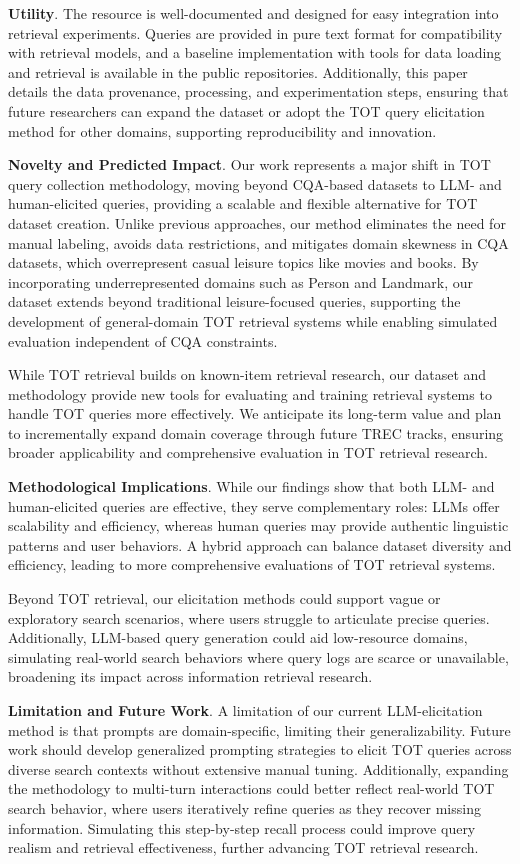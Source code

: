 \textbf{Utility}.
%
The resource is well-documented and designed for easy integration into retrieval experiments. Queries are provided in pure text format for compatibility with retrieval models, and a baseline implementation with tools for data loading and retrieval is available in the public repositories.
Additionally, this paper details the data provenance, processing, and experimentation steps, ensuring that future researchers can expand the dataset or adopt the TOT query elicitation method for other domains, supporting reproducibility and innovation.




\textbf{Novelty and Predicted Impact}.
Our work represents a major shift in TOT query collection methodology, moving beyond CQA-based datasets to LLM- and human-elicited queries, providing a scalable and flexible alternative for TOT dataset creation. Unlike previous approaches, our method eliminates the need for manual labeling, avoids data restrictions, and mitigates domain skewness in CQA datasets, which overrepresent casual leisure topics like movies and books. By incorporating underrepresented domains such as Person and Landmark, our dataset extends beyond traditional leisure-focused queries, supporting the development of general-domain TOT retrieval systems while enabling simulated evaluation independent of CQA constraints.

While TOT retrieval builds on known-item retrieval research, our dataset and methodology provide new tools for evaluating and training retrieval systems to handle TOT queries more effectively. We anticipate its long-term value and plan to incrementally expand domain coverage through future TREC tracks, ensuring broader applicability and comprehensive evaluation in TOT retrieval research.

\textbf{Methodological Implications}.
While our findings show that both LLM- and human-elicited queries are effective, they serve complementary roles: LLMs offer scalability and efficiency, whereas human queries may provide authentic linguistic patterns and user behaviors. A hybrid approach can balance dataset diversity and efficiency, leading to more comprehensive evaluations of TOT retrieval systems.

Beyond TOT retrieval, our elicitation methods could support vague or exploratory search scenarios, where users struggle to articulate precise queries. Additionally, LLM-based query generation could aid low-resource domains, simulating real-world search behaviors where query logs are scarce or unavailable, broadening its impact across information retrieval research.

\textbf{Limitation and Future Work}.
A limitation of our current LLM-elicitation method is that prompts are domain-specific, limiting their generalizability. Future work should develop generalized prompting strategies to elicit TOT queries across diverse search contexts without extensive manual tuning.
%
Additionally, expanding the methodology to multi-turn interactions could better reflect real-world TOT search behavior, where users iteratively refine queries as they recover missing information. Simulating this step-by-step recall process could improve query realism and retrieval effectiveness, further advancing TOT retrieval research.